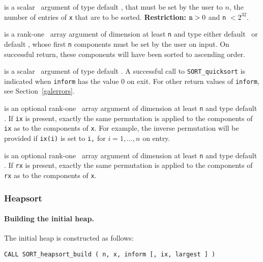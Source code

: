 \documentclass{galahad}
\newcommand{\packagename}{SORT}
\begin{document}
\begin{description}
 is a scalar \intentin\ argument of type default
\integer, that must be set by the user to $n$, the
number of entries of {\tt x} that are to be sorted.
{\bf Restriction:} ${\tt n} > 0$  and {\tt n} $< 2^{32}$.

 is a rank-one \intentinout\ array argument of
dimension at least {\tt n} and type either default
\integer\ or default \realdp, whose first {\tt n} components must be set by
the user on input. On successful return, these components will have
been sorted to ascending order.

 is a scalar \intentout\ argument of type default \integer.
A successful call to {\tt \packagename\_quicksort}
is indicated when {\tt inform} has the value 0 on exit.
For other return values of {\tt inform}, see Section~\ref{galerrors}.

 is an optional rank-one \intentinout\ array argument of
dimension at least {\tt n} and type default \integer.
If {\tt ix} is present, exactly the same permutation is applied to the
components of {\tt ix} as to the components of {\tt x}.
For example, the inverse permutation will be provided if {\tt ix(i)} is set to
{\tt i,} for $i = 1, \ldots, n$ on entry.

 is an optional rank-one \intentinout\ array argument of
dimension at least {\tt n} and type default \realdp.
If {\tt rx} is present, exactly the same permutation is applied to the
components of {\tt rx} as to the components of {\tt x}.

\end{description}


\subsubsection{Heapsort}

\paragraph{Building the initial heap.}
The initial heap is constructed as follows:
\vspace*{1mm}

\hspace{8mm}
{\tt CALL \packagename\_heapsort\_build ( n, x, inform [, ix, largest ] )}
\end{document}
